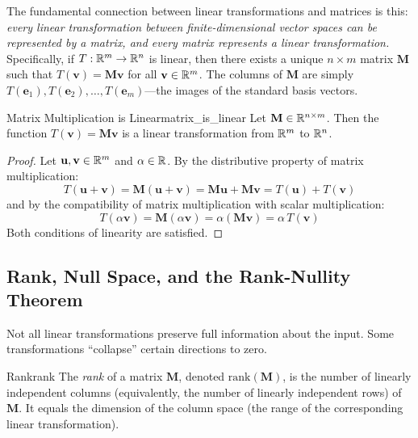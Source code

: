 The fundamental connection between linear transformations and matrices is this: \emph{every linear transformation between finite-dimensional vector spaces can be represented by a matrix, and every matrix represents a linear transformation.} Specifically, if $T: \mathbb{R}^m \to \mathbb{R}^n$ is linear, then there exists a unique $n \times m$ matrix $\mathbf{M}$ such that $T(\mathbf{v}) = \mathbf{M}\mathbf{v}$ for all $\mathbf{v} \in \mathbb{R}^m$. The columns of $\mathbf{M}$ are simply $T(\mathbf{e}_1), T(\mathbf{e}_2), \ldots, T(\mathbf{e}_m)$---the images of the standard basis vectors.

\begin{theorem}{Matrix Multiplication is Linear}{matrix_is_linear}
Let $\mathbf{M} \in \mathbb{R}^{n \times m}$. Then the function $T(\mathbf{v}) = \mathbf{M}\mathbf{v}$ is a linear transformation from $\mathbb{R}^m$ to $\mathbb{R}^n$.
\end{theorem}

\begin{proof}
Let $\mathbf{u}, \mathbf{v} \in \mathbb{R}^m$ and $\alpha \in \mathbb{R}$. By the distributive property of matrix multiplication:
\begin{equation}
    T(\mathbf{u} + \mathbf{v}) = \mathbf{M}(\mathbf{u} + \mathbf{v}) = \mathbf{M}\mathbf{u} + \mathbf{M}\mathbf{v} = T(\mathbf{u}) + T(\mathbf{v})
\end{equation}
and by the compatibility of matrix multiplication with scalar multiplication:
\begin{equation}
    T(\alpha \mathbf{v}) = \mathbf{M}(\alpha \mathbf{v}) = \alpha (\mathbf{M}\mathbf{v}) = \alpha \, T(\mathbf{v})
\end{equation}
Both conditions of linearity are satisfied.
\end{proof}

\subsection{Rank, Null Space, and the Rank-Nullity Theorem}
\label{subsec:rank_nullity}

Not all linear transformations preserve full information about the input. Some transformations ``collapse'' certain directions to zero.

\begin{definition}{Rank}{rank}
The \emph{rank} of a matrix $\mathbf{M}$, denoted $\text{rank}(\mathbf{M})$, is the number of linearly independent columns (equivalently, the number of linearly independent rows) of $\mathbf{M}$. It equals the dimension of the column space (the range of the corresponding linear transformation).
\end{definition}

